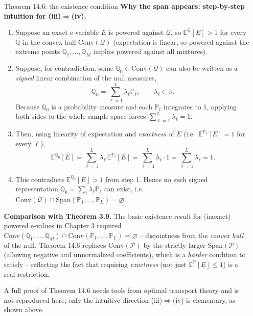 \documentclass[aspectratio=169,10pt]{beamer}
\newcommand{\PP}{\mathbb{P}}
\newcommand{\QQ}{\mathbb{Q}}
\newcommand{\EE}{\mathbb{E}}
\newcommand{\RR}{\mathbb{R}}
\newcommand{\calP}{\mathcal{P}}
\newcommand{\calQ}{\mathcal{Q}}
\newcommand{\Conv}{\mathrm{Conv}}
\newcommand{\Span}{\mathrm{Span}}
\begin{document}
\begin{frame}[allowframebreaks]{Theorem 14.6: the existence condition}
  \textbf{Why the span appears: step-by-step intuition for (iii)$\Rightarrow$(iv).}
  \begin{enumerate}
    \item Suppose an exact e-variable $E$ is powered against $\calQ$, so
      $\EE^{\QQ}[E] > 1$ for every $\QQ$ in the convex hull
      $\Conv(\calQ)$ (expectation is linear, so powered against the
      extreme points $\QQ_1,\dots,\QQ_M$ implies powered against all
      mixtures).
    \item Suppose, for contradiction, some $\QQ_0 \in \Conv(\calQ)$ can
      also be written as a \emph{signed} linear combination of the null
      measures,
      \[
        \QQ_0 = \sum_{\ell=1}^L \lambda_\ell \PP_\ell, \qquad \lambda_\ell \in \RR.
      \]
      Because $\QQ_0$ is a probability measure and each $\PP_\ell$
      integrates to 1, applying both sides to the whole sample space
      forces $\sum_{\ell=1}^L \lambda_\ell = 1$.
    \item Then, using linearity of expectation and \emph{exactness} of
      $E$ (i.e.\ $\EE^{\PP_\ell}[E] = 1$ for every $\ell$),
      \[
        \EE^{\QQ_0}[E] = \sum_{\ell=1}^L \lambda_\ell\, \EE^{\PP_\ell}[E]
        = \sum_{\ell=1}^L \lambda_\ell \cdot 1 = \sum_{\ell=1}^L \lambda_\ell = 1.
      \]
    \item This contradicts $\EE^{\QQ_0}[E] > 1$ from step 1. Hence no
      such signed representation $\QQ_0 = \sum_\ell \lambda_\ell \PP_\ell$
      can exist, i.e.\
      $\Conv(\calQ) \cap \Span(\PP_1,\dots,\PP_L) = \varnothing$.
  \end{enumerate}

  \framebreak

  \textbf{Comparison with Theorem 3.9.} The basic existence result for
  (inexact) powered e-values in Chapter 3 required
  $\Conv(\QQ_1,\dots,\QQ_M) \cap \Conv(\PP_1,\dots,\PP_L) = \varnothing$
  -- disjointness from the \emph{convex hull} of the null. Theorem 14.6
  replaces $\Conv(\calP)$ by the strictly larger $\Span(\calP)$ (allowing
  negative and unnormalized coefficients), which is a \emph{harder}
  condition to satisfy -- reflecting the fact that requiring
  \emph{exactness} (not just $\EE^{\PP}[E]\le 1$) is a real restriction.

  A full proof of Theorem 14.6 needs tools from optimal transport theory
  and is not reproduced here; only the intuitive direction
  (iii)$\Rightarrow$(iv) is elementary, as shown above.
\end{frame}
\end{document}
